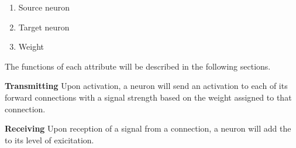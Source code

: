 \documentclass{article} %
\begin{document}
    \begin{enumerate}[noitemsep]
        \item Source neuron
        \item Target neuron 
        \item Weight
    \end{enumerate}
    The functions of each attribute will be described in the following sections.\newline

    \textbf{Transmitting} Upon activation, a neuron will send an activation to each of its forward connections with a signal strength based on the weight assigned to that connection.\newline

    \textbf{Receiving} Upon reception of a signal from a connection, a neuron will add the to its level of exicitation. 
\end{document}
